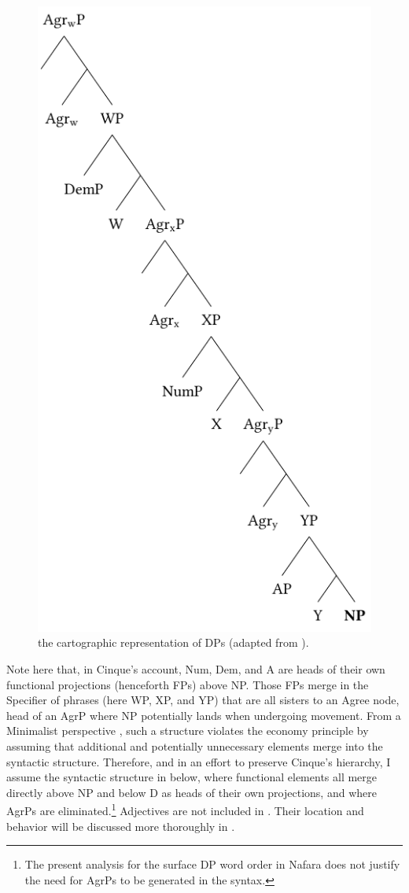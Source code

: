 \documentclass[output=paper]{langscibook}
\begin{document}
  
\begin{figure} 
\includegraphics{figures/baron-img1.pdf} %
\caption{the cartographic representation of DPs (adapted from \citealt[(2)]{Cinque2005}).} 
\label{fig:baron:1}
\end{figure}

Note here that, in Cinque’s account, Num, Dem, and A are heads of their own functional projections (henceforth FPs) above NP. Those FPs merge in the Specifier of phrases (here WP, XP, and YP) that are all sisters to an Agree node, head of an AgrP where NP potentially lands when undergoing movement. From a Minimalist perspective \citep{Chomsky1995}, such a structure violates the economy principle by assuming that additional and potentially unnecessary elements merge into the syntactic structure. Therefore, and in an effort to preserve Cinque’s hierarchy, I assume the syntactic structure in  below, where functional elements all merge directly above NP and below D as heads of their own projections, and where AgrPs are eliminated.\footnote{The present analysis for the surface DP word order in Nafara does not justify the need for AgrPs to be generated in the syntax.} Adjectives are not included in . Their location and behavior will be discussed more thoroughly in .
\end{document}
